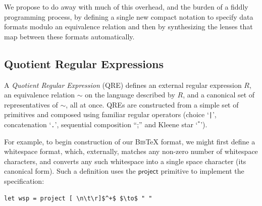\documentclass[acmsmall,review,anonymous]{acmart}\settopmatter{printfolios=true,printccs=false,printacmref=false}
\newcommand{\kw}[1]{\ensuremath{\mathsf{#1}}}
\newcommand{\bibtex}{\textsc{Bib}\TeX{}}
\newcommand{\cd}[1]{\lstinline[backgroundcolor=\color{white}]$#1$}
\begin{document}

We propose to do away with much of this overhead, and the burden of a
fiddly programming process, by defining a single new compact notation
to specify data formats modulo an equivalence relation and then by
synthesizing the lenses that map between these formats automatically.

\subsection{Quotient Regular Expressions}

A {\em Quotient Regular Expression} (QRE) defines an external regular
expression $R$, an equivalence relation $\sim$ on the language
described by $R$, and a canonical set of representatives of $\sim$,
all at once.  QREs are constructed from a simple set of primitives
and composed using familiar regular operators
(choice `\cd{|}', concatenation `\cd{.}', sequential composition ``;''
and Kleene star `$^*$').

For example, to begin construction of our \bibtex{} format, we might
first define a whitespace format, which, externally, matches
any non-zero number of whitespace characters, and converts
any such whitespace into a single space character (its canonical form).
Such a definition uses the \kw{project} primitive to implement the
specification:

\begin{lstlisting}
let wsp = project [ \n\t\r]$^+$ $\to$ " "
\end{lstlisting}
\end{document}
